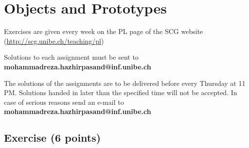 \documentclass [11pt, a4wide, twoside]{article}
\begin{document}
\section*{\space{} Objects and Prototypes}


\begin{myitemize}
\item Exercises are given every week on the PL page of the SCG website \\ (\url{http://scg.unibe.ch/teaching/pl})
\item Solutions to each assignment must be sent to \textbf{mohammadreza.hazhirpasand@inf.unibe.ch}
\item The solutions of the assignments are to be delivered before every Thursday at 11 PM. Solutions handed in later than the specified time will not be accepted. In case of serious reasons send an e-mail to  \textbf{mohammadreza.hazhirpasand@inf.unibe.ch}
\end{myitemize}


\subsection*{Exercise (6 points)}
\end{document}
